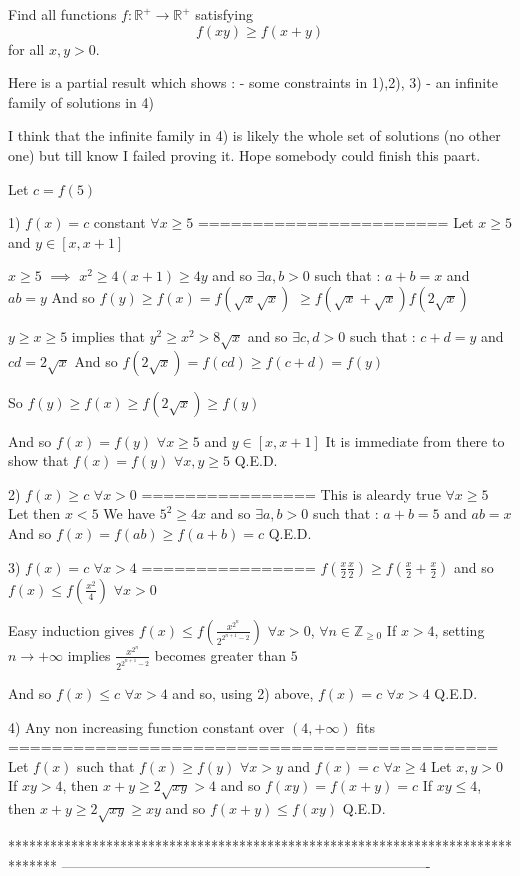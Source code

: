 \begin{solution}
	\begin{tcolorbox}Find all functions $f:\mathbb{R}^+ \rightarrow \mathbb{R}^+$ satisfying $$f(xy) \geq f(x+y)$$ for all $x,y>0$.\end{tcolorbox}
Here is a partial result which shows :
 - some constraints in 1),2), 3)
 - an infinite family of solutions in 4)
 
I think that the infinite family in 4) is likely the whole set of solutions (no other one) but till know I failed proving it. Hope somebody could finish this paart.

Let $c=f(5)$

1) $f(x)=c$ constant $\forall x\ge 5$
=======================
Let $x\ge 5$ and $y\in[x,x+1]$

$x\ge 5$ $\implies$ $x^2\ge 4(x+1)\ge 4y$ and so $\exists a,b>0$ such that :
$a+b=x$ and $ab=y$ 
And so $f(y)\ge f(x)=f(\sqrt x\sqrt x)$ $\ge f(\sqrt x+\sqrt x)f(2\sqrt x)$

$y\ge x\ge 5$ implies that $y^2\ge x^2 >8\sqrt x$ and so $\exists c,d>0$ such that :
$c+d=y$ and $cd=2\sqrt x$
And so $f(2\sqrt x)=f(cd)\ge f(c+d)=f(y)$

So $f(y)\ge f(x)\ge f(2\sqrt x)\ge f(y)$

And so $f(x)=f(y)$ $\forall x\ge 5$ and $y\in[x,x+1]$
It is immediate from there to show that $f(x)=f(y)$ $\forall x,y\ge 5$
Q.E.D.

2) $f(x)\ge c$ $\forall x>0$
================
This is aleardy true $\forall x\ge 5$
Let then $x<5$
We have $5^2\ge 4x$ and so $\exists a,b>0$ such that :
$a+b=5$ and $ab=x$
And so $f(x)=f(ab)\ge f(a+b)=c$
Q.E.D.

3) $f(x)=c$ $\forall x>4$
================
$f(\frac x2\frac x2)\ge f(\frac x2+\frac x2)$ and so $f(x)\le f(\frac{x^2}4)$ $\forall x>0$

Easy induction gives $f(x)\le f(\frac{x^{2^n}}{2^{2^{n+1}-2}})$ $\forall x>0$, $\forall n\in\mathbb Z_{\ge 0}$
If $x>4$, setting $n\to+\infty$ implies $\frac{x^{2^n}}{2^{2^{n+1}-2}}$ becomes greater than $5$

And so $f(x)\le c$ $\forall x>4$ and so, using 2) above, $f(x)=c$ $\forall x>4$
Q.E.D.

4) Any non increasing function constant over $(4,+\infty)$ fits
=============================================
Let $f(x)$ such that $f(x)\ge f(y)$ $\forall x>y$ and $f(x)=c$ $\forall x\ge 4$
Let $x,y>0$
If $xy>4$, then $x+y\ge 2\sqrt{xy}>4$ and so $f(xy)=f(x+y)=c$
If $xy\le 4$, then $x+y\ge 2\sqrt{xy}\ge xy$ and so $f(x+y)\le f(xy)$
Q.E.D.



\end{solution}
*******************************************************************************
-------------------------------------------------------------------------------

